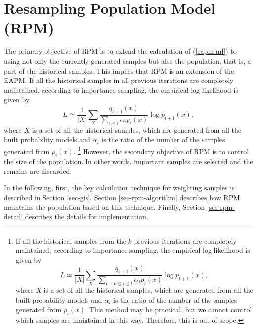 \section{Resampling Population Model (RPM)}
The primary objective of RPM is
to extend the calculation of (\ref{eapm-ml})
to using not only the currently generated samples 
but also the population, that is, a part of the historical samples.
This implies that RPM is an extension of the EAPM.
If all the historical samples in all previous iterations are
completely maintained,
according to importance sampling, the empirical log-likelihood is given by
\begin{equation}
\label{all_history}
 L\simeq\frac{1}{|X|}\sum_{X} \frac{q_{t+1}(x)}{\sum_{i \leq  t} \alpha_i p_i(x)} \log p_{t+1}(x),
\end{equation}
where $X$ is a set of all the historical samples,
which are generated from all the built probability models
and $\alpha_i$ is the ratio of the number of the samples generated from
$p_i(x)$.
\footnote{
If all the historical samples from the $k$ previous iterations are
completely maintained,
according to importance sampling, the empirical log-likelihood is given by
\begin{equation}
 L\simeq\frac{1}{|X|}\sum_{X} \frac{q_{t+1}(x)}{\sum_{t-k\leq i \leq  t} \alpha_i p_i(x)} \log p_{t+1}(x),
\end{equation}
where $X$ is a set of all the historical samples,
which are generated from all the built probability models
and $\alpha_i$ is the ratio of the number of the samples generated from
$p_i(x)$.
This method may be practical, but we cannot control which samples are
maintained in this way.
Therefore, this is out of scope.
}
However, the secondary objective of RPM is to control the size of
the population.
In other words, 
important samples are selected and the remains are discarded.

In the following,
first, the key calculation technique for
weighting samples is described in Section \ref{sec-gis}.
Section \ref{sec-rpm-algorithm} describes how RPM
maintains the population based on this technique. 
Finally, Section \ref{sec-rpm-detail} describes the details for implementation.


